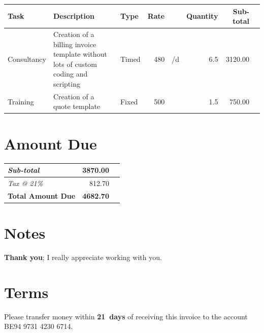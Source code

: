 \documentclass[a4paper,table]{article}
\begin{document}
\extrarowsep=1mm

\begin{center}
\label{tab:orgtable1}

\begin{tabu}{lXlrlrrl}
Task & Description & Type & Rate &  & Quantity & Sub-total & \\
\hline
Consultancy & Creation of a billing invoice template without lots of custom coding and scripting & Timed & 480 & \texteuro{}/d & 6.5 & 3120.00 & \texteuro{}\\
\hline
Training & Creation of a quote template & Fixed & 500 & \texteuro{} & 1.5 & 750.00 & \texteuro{}\\
\end{tabu}
\end{center}

\section*{Amount Due}
\label{sec:orgheadline2}

\hfill\colorbox{prlp-gray96}{\begin{minipage}{7.5cm}
\begin{center}
\begin{tabu}{Xrl}
\emph{Sub-total} & 3870.00 & \texteuro{}\\
\hline
\emph{Tax @ 21\%} & 812.70 & \texteuro{}\\
\hline
\textbf{Total Amount Due} & \textbf{\large{4682.70}} & \textbf{\texteuro{}}\\
\end{tabu}
\end{center}

\end{minipage}}

\section*{Notes}
\label{sec:orgheadline3}
{\Fontskrivan
\textbf{Thank you}; I really appreciate working with you.
}

\section*{Terms}
\label{sec:orgheadline4}

Please transfer money within \textbf{21~days} of receiving this invoice to the account
BE94 9731 4230 6714.
\end{document}
